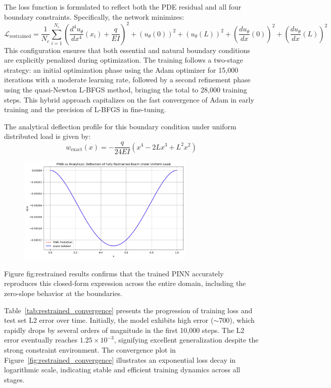 \documentclass[12pt]{article}
\begin{document}
The loss function is formulated to reflect both the PDE residual and all four boundary constraints. Specifically, the network minimizes:
\[
\mathcal{L}_{\text{restrained}} = \frac{1}{N_c}\sum_{i=1}^{N_c} \left( \frac{d^4u_\theta}{dx^4}(x_i) + \frac{q}{EI} \right)^2 + 
\left(u_\theta(0)\right)^2 + \left(u_\theta(L)\right)^2 +
\left(\frac{du_\theta}{dx}(0)\right)^2 + \left(\frac{du_\theta}{dx}(L)\right)^2
\]
This configuration ensures that both essential and natural boundary conditions are explicitly penalized during optimization. The training follows a two-stage strategy: an initial optimization phase using the Adam optimizer for 15,000 iterations with a moderate learning rate, followed by a second refinement phase using the quasi-Newton L-BFGS method, bringing the total to 28,000 training steps. This hybrid approach capitalizes on the fast convergence of Adam in early training and the precision of L-BFGS in fine-tuning.

The analytical deflection profile for this boundary condition under uniform distributed load is given by:
\[
w_{\text{exact}}(x) = -\frac{q}{24EI}(x^4 - 2Lx^3 + L^2x^2)
\]

\begin{figure}[htbp]
    \centering
    \includegraphics[width=0.75\textwidth]{restrained_results.png}
    \caption{}
    \label{fig:restrained results}
\end{figure}

Figure {fig:restrained results} confirms that the trained PINN accurately reproduces this closed-form expression across the entire domain, including the zero-slope behavior at the boundaries.

Table~\ref{tab:restrained_convergence} presents the progression of training loss and test set L2 error over time. Initially, the model exhibits high error ($\sim$700), which rapidly drops by several orders of magnitude in the first 10,000 steps. The L2 error eventually reaches $1.25 \times 10^{-3}$, signifying excellent generalization despite the strong constraint environment. The convergence plot in Figure~\ref{fig:restrained_convergence} illustrates an exponential loss decay in logarithmic scale, indicating stable and efficient training dynamics across all stages.
\end{document}
